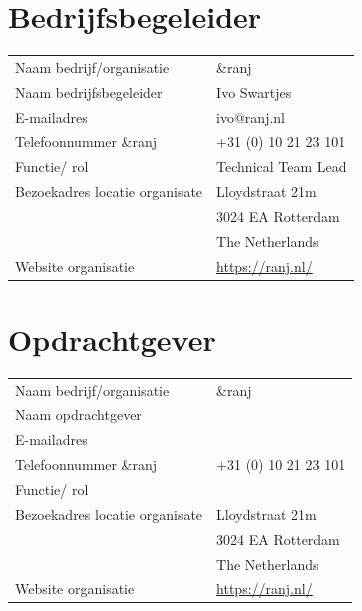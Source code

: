 \documentclass{report}
\newcommand{\organisation}{\&ranj}
\begin{document}
\section*{Bedrijfsbegeleider}
\begin{table}[h]
\begin{tabular}{ll}
Naam bedrijf/organisatie & \organisation \\
Naam bedrijfsbegeleider & Ivo Swartjes \\
E-mailadres & ivo@ranj.nl \\
Telefoonnummer \organisation & +31 (0) 10 21 23 101 \\
Functie/ rol & Technical Team Lead \\
Bezoekadres locatie organisate & Lloydstraat 21m \\ 
 & 3024 EA Rotterdam \\
 & The Netherlands \\
Website organisatie & \url{https://ranj.nl/}
\end{tabular}
\end{table}

\section*{Opdrachtgever}
\begin{table}[h]
\begin{tabular}{ll}
Naam bedrijf/organisatie & \organisation \\
Naam opdrachtgever & \\ %
E-mailadres &  \\
Telefoonnummer \organisation & +31 (0) 10 21 23 101 \\
Functie/ rol &  \\
Bezoekadres locatie organisate & Lloydstraat 21m \\ 
 & 3024 EA Rotterdam \\
 & The Netherlands \\
Website organisatie & \url{https://ranj.nl/}
\end{tabular}
\end{table}
\end{document}
